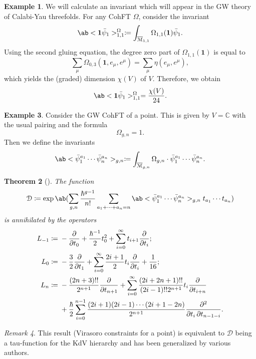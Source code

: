 \documentclass[10pt]{amsart}
\newtheorem{thm}{Theorem}[section]
\theoremstyle{definition}
\newtheorem{exm}[thm]{Example}
\theoremstyle{remark}
\newtheorem{rmk}[thm]{Remark}
\theoremstyle{plain}
\theoremstyle{definition}
\theoremstyle{remark}
\newcommand{\C}{\mathbb{C}}
\newcommand{\Mbar}{\overline{\mathcal{M}}}
\newcommand{\mc}[1]{\mathcal{#1}}
\newcommand{\1}{\mathbf{1}}
\newcommand{\2}{\mathbf{2}}
\newcommand{\3}{\mathbf{3}}
\begin{document}
\begin{exm}
    We will calculate an invariant which will appear in the GW theory of Calabi-Yau threefolds. For any CohFT $\Omega$, consider the invariant
    \[ \ab<\1\bar{\psi}_1>_{1,1}^{\Omega}\coloneqq \int_{\Mbar_{1,1}} \Omega_{1,1}(\1)\bar{\psi}_1. \]
    Using the second gluing equation, the degree zero part of $\Omega_{1,1}(\1)$ is equal to
    \[ \sum_{\mu} \Omega_{0,3}(\1, e_{\mu}, e^{\mu}) = \sum_{\mu} \eta(e_{\mu}, e^{\mu}), \]
    which yields the (graded) dimension $\chi(V)$ of $V$. Therefore, we obtain
    \[ \ab<\1\bar{\psi}_1>_{1,1}^{\Omega} = \frac{\chi(V)}{24}. \]
\end{exm}

\begin{exm}
    Consider the GW CohFT of a point. This is given by $V = \C$ with the usual pairing and the formula 
    \[ \Omega_{g,n} = 1. \]
    Then we define the invariants
    \[ \ab<\bar{\psi}_1^{a_1} \cdots \bar{\psi}_n^{a_n}>_{g,n} \coloneqq \int_{\Mbar_{g,n}} \Omega_{g,n} \cdot \bar{\psi}_1^{a_1} \cdots \bar{\psi}_n^{a_n}. \]
    \begin{thm}[{\cite{wittenconj}}]
        The function
        \[ \mc{D} \coloneqq \exp \ab(\sum_{g,n} \frac{\hbar^{g-1}}{n!}\sum_{a_1 + \cdots + a_n = n} \ab<\bar{\psi}_1^{a_1} \cdots \bar{\psi}_n^{a_n}>_{g,n} t_{a_1}\cdots t_{a_n}) \]
        is annihilated by the operators
        \begin{align*}
            L_{-1} \coloneqq{}& -\pdv{}{t_0} + \frac{\hbar^{-1}}{2} t_0^2 + \sum_{i=0}^{\infty} t_{i+1} \pdv{}{t_i};\\
            L_0 \coloneqq{}& -\frac{3}{2} \pdv{}{t_1} + \sum_{i=0}^{\infty} \frac{2i+1}{2} t_i \pdv{}{t_i} + \frac{1}{16};\\
            L_n \coloneqq{}& -\frac{(2n+3)!!}{2^{n+1}} \pdv{}{t_{n+1}} + \sum_{i=0}^{\infty} \frac{(2i+2n+1)!!}{(2i-1)!! 2^{n+1}} t_i \pdv{}{t_{i+n}} \\
            &+ \frac{\hbar}{2} \sum_{i=0}^{n-1} \frac{(2i+1) (2i-1) \cdots (2i+1-2n)}{2^{n+1}} \pdv{}{t_i,t_{n-1-i}}.
        \end{align*}
    \end{thm}
\end{exm}

\begin{rmk}
    This result (Virasoro constraints for a point) is equivalent to $\mc{D}$ being a tau-function for the KdV hierarchy and has been generalized by various authors.
\end{rmk}
\end{document}
